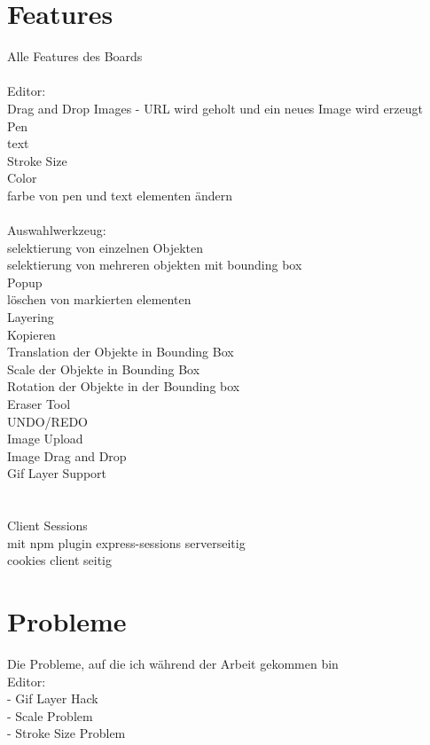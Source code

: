 \section{Features}\label{Features}
Alle Features des Boards\\
\\
Editor:\\
Drag and Drop Images - URL wird geholt und ein neues Image wird erzeugt\\
Pen\\
text\\
Stroke Size\\
Color\\
farbe von pen und text elementen ändern\\
\\
Auswahlwerkzeug:\\
selektierung von einzelnen Objekten\\
selektierung von mehreren objekten mit bounding box\\
Popup\\
löschen von markierten elementen\\
Layering\\
Kopieren\\
Translation der Objekte in Bounding Box\\
Scale der Objekte in Bounding Box\\
Rotation der Objekte in der Bounding box\\
Eraser Tool\\
UNDO/REDO\\
Image Upload\\
Image Drag and Drop\\
Gif Layer Support\\
\\
\\
Client Sessions\\
mit npm plugin express-sessions serverseitig\\
cookies client seitig


\section{Probleme}\label{Probleme}
Die Probleme, auf die ich während der Arbeit gekommen bin\\
Editor:\\
- Gif Layer Hack\\
- Scale Problem\\
- Stroke Size Problem\\
